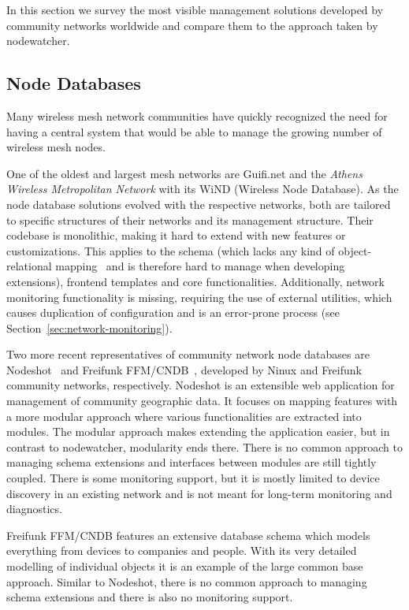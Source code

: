 \documentclass[5p,sort&compress]{elsarticle}
\begin{document}
In this section we survey the most visible management solutions developed by community networks worldwide and compare them to the approach taken by nodewatcher.

\subsection{Node Databases}

Many wireless mesh network communities have quickly recognized the need for having a central system that would be able to manage the growing number of wireless mesh nodes.

One of the oldest and largest mesh networks are Guifi.net \cite{Guifi_2003,Vega_2012} and the \textit{Athens Wireless Metropolitan Network} with its WiND \cite{AWMN_WIND_2002} (Wireless Node Database).
As the node database solutions evolved with the respective networks, both are tailored to specific structures of their networks and its management structure.
Their codebase is monolithic, making it hard to extend with new features or customizations.
This applies to the schema (which lacks any kind of object-relational mapping~\cite{ONeil_2008} and is therefore hard to manage when developing extensions), frontend templates and core functionalities.
Additionally, network monitoring functionality is missing, requiring the use of external utilities, which causes duplication of configuration and is an error-prone process (see Section~\ref{sec:network-monitoring}).

Two more recent representatives of community network node databases are Nodeshot~\cite{Nodeshot_2012} and Freifunk FFM/CNDB~\cite{Funkfeuer_2012}, developed by Ninux and Freifunk community networks, respectively.
Nodeshot is an extensible web application for management of community geographic data.
It focuses on mapping features with a more modular approach where various functionalities are extracted into modules.
The modular approach makes extending the application easier, but in contrast to nodewatcher, modularity ends there.
There is no common approach to managing schema extensions and interfaces between modules are still tightly coupled.
There is some monitoring support, but it is mostly limited to device discovery in an existing network and is not meant for long-term monitoring and diagnostics.

Freifunk FFM/CNDB features an extensive database schema which models everything from devices to companies and people.
With its very detailed modelling of individual objects it is an example of the large common base approach.
Similar to Nodeshot, there is no common approach to managing schema extensions and there is also no monitoring support.
\end{document}
